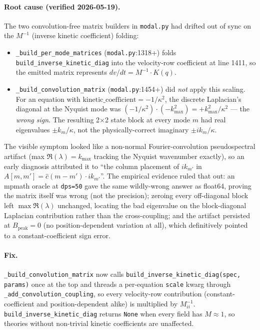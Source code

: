\paragraph{Root cause (verified 2026-05-19).} The two convolution-free
matrix builders in \texttt{modal.py} had drifted out of sync on the
$M^{-1}$ (inverse kinetic coefficient) folding:
\begin{itemize}
  \item \texttt{\_build\_per\_mode\_matrices} (\texttt{modal.py}:1318+)
    folds \texttt{build\_inverse\_kinetic\_diag} into the velocity-row
    coefficient at line 1411, so the emitted matrix represents
    $dv/dt = M^{-1} \cdot K(q)$.
  \item \texttt{\_build\_convolution\_matrix} (\texttt{modal.py}:1454+)
    did \emph{not} apply this scaling. For an equation with
    $\text{kinetic\_coefficient} = -1/\kappa^2$, the discrete
    Laplacian's diagonal at the Nyquist mode was
    $(-1/\kappa^2) \cdot (-k_{\max}^2) = +k_{\max}^2 / \kappa^2$ — the
    \emph{wrong sign}. The resulting 2$\times$2 state block at every
    mode $m$ had real eigenvalues $\pm k_m / \kappa$, not the
    physically-correct imaginary $\pm i k_m / \kappa$.
\end{itemize}
The visible symptom looked like a non-normal Fourier-convolution
pseudospectral artifact (max $\Re(\lambda) = k_{\max}$ tracking the
Nyquist wavenumber exactly), so an early diagnosis attributed it to
``the column placement of $i k_{m'}$ in $A[m, m'] = \widehat{c}(m-m')
\cdot i k_{m'}$''. The empirical evidence ruled that out: an mpmath
oracle at \texttt{dps=50} gave the same wildly-wrong answer as float64,
proving the matrix itself was wrong (not the precision); zeroing every
off-diagonal block left $\max\Re(\lambda)$ unchanged, locating the
bad eigenvalue on the block-diagonal Laplacian contribution rather than
the cross-coupling; and the artifact persisted at $B_{\mathrm{peak}}=0$
(no position-dependent variation at all), which definitively pointed
to a constant-coefficient sign error.

\paragraph{Fix.} \texttt{\_build\_convolution\_matrix} now calls
\texttt{build\_inverse\_kinetic\_diag(spec, params)} once at the top and
threads a per-equation \texttt{scale} kwarg through
\texttt{\_add\_convolution\_coupling}, so every velocity-row
contribution (constant-coefficient and position-dependent alike) is
multiplied by $M_{ii}^{-1}$. \texttt{build\_inverse\_kinetic\_diag}
returns \texttt{None} when every field has $M \approx 1$, so theories
without non-trivial kinetic coefficients are unaffected.

